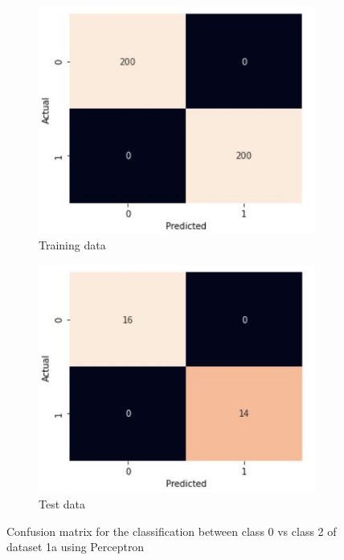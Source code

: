 \documentclass[11pt]{article}
\begin{document}
\begin{figure}[h]
\centering
	\begin{subfigure}[b]{0.45\textwidth}
	\centering
	\includegraphics[scale=0.45]{dataset1a_perceptron_02_cm_train.jpg}
	\caption{Training data}
	\label{fig:fig1.1.2.1}
	\end{subfigure}
	\begin{subfigure}[b]{0.45\textwidth}
	\centering
	\includegraphics[scale=0.45]{dataset1a_perceptron_02_cm_test.jpg}
	\caption{Test data}
	\label{fig:fig1.1.2.2}
	\end{subfigure}
\caption{Confusion matrix for the classification between class 0 vs class 2 of dataset 1a using Perceptron}
\label{fig:fig1.1.2}
\end{figure}
\end{document}
